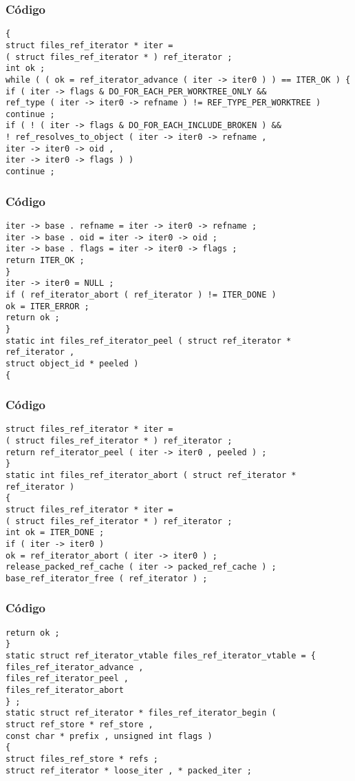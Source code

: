 \documentclass{beamer}
\begin{document}
\begin{frame}[fragile]
\frametitle{C\'odigo}
\begin{verbatim}
{ 
struct files_ref_iterator * iter = 
( struct files_ref_iterator * ) ref_iterator ; 
int ok ; 
while ( ( ok = ref_iterator_advance ( iter -> iter0 ) ) == ITER_OK ) { 
if ( iter -> flags & DO_FOR_EACH_PER_WORKTREE_ONLY && 
ref_type ( iter -> iter0 -> refname ) != REF_TYPE_PER_WORKTREE ) 
continue ; 
if ( ! ( iter -> flags & DO_FOR_EACH_INCLUDE_BROKEN ) && 
! ref_resolves_to_object ( iter -> iter0 -> refname , 
iter -> iter0 -> oid , 
iter -> iter0 -> flags ) ) 
continue ; 
\end{verbatim}
\end{frame}
\begin{frame}[fragile]
\frametitle{C\'odigo}
\begin{verbatim}
iter -> base . refname = iter -> iter0 -> refname ; 
iter -> base . oid = iter -> iter0 -> oid ; 
iter -> base . flags = iter -> iter0 -> flags ; 
return ITER_OK ; 
} 
iter -> iter0 = NULL ; 
if ( ref_iterator_abort ( ref_iterator ) != ITER_DONE ) 
ok = ITER_ERROR ; 
return ok ; 
} 
static int files_ref_iterator_peel ( struct ref_iterator * ref_iterator , 
struct object_id * peeled ) 
{ 
\end{verbatim}
\end{frame}
\begin{frame}[fragile]
\frametitle{C\'odigo}
\begin{verbatim}
struct files_ref_iterator * iter = 
( struct files_ref_iterator * ) ref_iterator ; 
return ref_iterator_peel ( iter -> iter0 , peeled ) ; 
} 
static int files_ref_iterator_abort ( struct ref_iterator * ref_iterator ) 
{ 
struct files_ref_iterator * iter = 
( struct files_ref_iterator * ) ref_iterator ; 
int ok = ITER_DONE ; 
if ( iter -> iter0 ) 
ok = ref_iterator_abort ( iter -> iter0 ) ; 
release_packed_ref_cache ( iter -> packed_ref_cache ) ; 
base_ref_iterator_free ( ref_iterator ) ; 
\end{verbatim}
\end{frame}
\begin{frame}[fragile]
\frametitle{C\'odigo}
\begin{verbatim}
return ok ; 
} 
static struct ref_iterator_vtable files_ref_iterator_vtable = { 
files_ref_iterator_advance , 
files_ref_iterator_peel , 
files_ref_iterator_abort 
} ; 
static struct ref_iterator * files_ref_iterator_begin ( 
struct ref_store * ref_store , 
const char * prefix , unsigned int flags ) 
{ 
struct files_ref_store * refs ; 
struct ref_iterator * loose_iter , * packed_iter ; 
\end{verbatim}
\end{frame}
\end{document}
